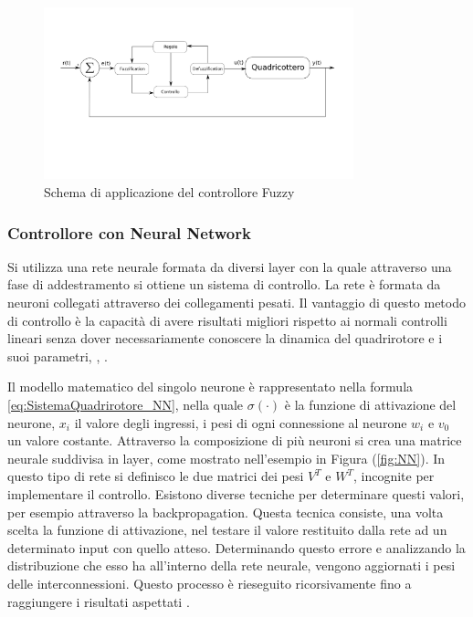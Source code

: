\begin{figure}
	\centering
	\includegraphics[width=0.8\textwidth]{SistemaQuadrirotore/Figure/Fuzzy}
	\caption{Schema di applicazione del controllore Fuzzy}
\end{figure}

\subsubsection{Controllore con Neural Network}

Si utilizza una rete neurale formata da diversi layer con la quale attraverso una fase di addestramento si ottiene un sistema di controllo. La rete è formata da neuroni collegati attraverso dei collegamenti pesati. Il vantaggio di questo metodo di controllo è la capacità di avere risultati migliori rispetto ai normali controlli lineari senza dover necessariamente conoscere la dinamica del quadrirotore e i suoi parametri, \cite{ZuluAndrew2014ARoC}, \cite{KimJinho2020ACSo}.

Il modello matematico del singolo neurone è rappresentato nella formula \ref{eq:SistemaQuadrirotore_NN}, nella quale $\sigma(\cdot)$ è la funzione di attivazione del neurone, $x_i$ il valore degli ingressi, i pesi di ogni connessione al neurone $w_i$ e $v_0$ un valore costante.
Attraverso la composizione di più neuroni si crea una matrice neurale suddivisa in layer, come mostrato nell'esempio in Figura (\ref{fig:NN}). In questo tipo di rete si definisco le due matrici dei pesi $V^T$ e $W^T$, incognite per implementare il controllo. Esistono diverse tecniche per determinare questi valori, per esempio attraverso la backpropagation.
Questa tecnica consiste, una volta scelta la funzione di attivazione, nel testare il valore restituito dalla rete ad un determinato input con quello atteso. Determinando questo errore e analizzando la distribuzione che esso ha all'interno della rete neurale, vengono aggiornati i pesi delle interconnessioni. Questo processo è rieseguito ricorsivamente fino a raggiungere i risultati aspettati \cite{YesildirakA2020NNCo}.


